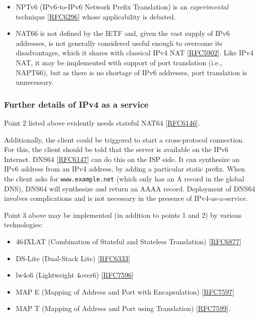 \documentclass[
]{article}
\providecommand{\tightlist}{%
  \setlength{\itemsep}{0pt}\setlength{\parskip}{0pt}}
\begin{document}
\begin{itemize}
  \begin{itemize}
  \item
    NPTv6 (IPv6-to-IPv6 Network Prefix Translation) is an
    \emph{experimental} technique
    {[}\href{https://www.rfc-editor.org/info/rfc6296}{RFC6296}{]} whose
    applicability is debated.
  \item
    NAT66 is not defined by the IETF and, given the vast supply of IPv6
    addresses, is not generally considered useful enough to overcome its
    disadvantages, which it shares with classical IPv4 NAT
    {[}\href{https://www.rfc-editor.org/info/rfc5902}{RFC5902}{]}. Like
    IPv4 NAT, it may be implemented with support of port translation
    (i.e., NAPT66), but as there is no shortage of IPv6 addresses, port
    translation is unnecessary.
  \end{itemize}
\end{itemize}

\subsubsection{Further details of IPv4 as a
service}\label{further-details-of-ipv4-as-a-service}

Point 2 listed above evidently needs stateful NAT64
{[}\href{https://www.rfc-editor.org/info/rfc6146}{RFC6146}{]}.

Additionally, the client could be triggered to start a cross-protocol
connection. For this, the client should be told that the server is
available on the IPv6 Internet. DNS64
{[}\href{https://www.rfc-editor.org/info/rfc6147}{RFC6147}{]} can do
this on the ISP side. It can synthesize an IPv6 address from an IPv4
address, by adding a particular static prefix. When the client asks for
\texttt{www.example.net} (which only has an A record in the global DNS),
DNS64 will synthesize and return an AAAA record. Deployment of DNS64
involves complications and is not necessary in the presence of
IPv4-as-a-service.

Point 3 above may be implemented (in addition to points 1 and 2) by
various technologies:

\begin{itemize}
\tightlist
\item
  464XLAT (Combination of Stateful and Stateless Translation)
  {[}\href{https://www.rfc-editor.org/info/rfc6877}{RFC6877}{]}
\item
  DS-Lite (Dual-Stack Lite)
  {[}\href{https://www.rfc-editor.org/info/rfc6333}{RFC6333}{]}
\item
  lw4o6 (Lightweight 4over6)
  {[}\href{https://www.rfc-editor.org/info/rfc7596}{RFC7596}{]}
\item
  MAP E (Mapping of Address and Port with Encapsulation)
  {[}\href{https://www.rfc-editor.org/info/rfc7597}{RFC7597}{]}
\item
  MAP T (Mapping of Address and Port using Translation)
  {[}\href{https://www.rfc-editor.org/info/rfc7599}{RFC7599}{]}.
\end{itemize}
\end{document}
